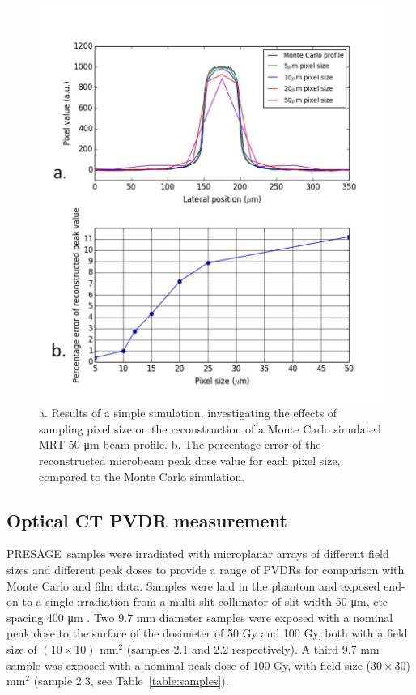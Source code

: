 	\begin{figure}
		\centering
		\includegraphics[width=\linewidth]{mrt_img/Beam_10um_sampling}
		\caption{a. Results of a simple simulation, investigating the effects of   sampling pixel size on the reconstruction of a Monte Carlo simulated  MRT 50 \si{\um} beam  profile. b. The percentage error of the reconstructed microbeam peak dose value for each pixel size, compared to the Monte Carlo simulation.}
		\label{fig:Beam_10um_sampling}
	\end{figure}
	
	\subsection{Optical CT PVDR measurement}
	PRESAGE\textregistered \ samples were irradiated with microplanar arrays of different field sizes and different peak doses to provide a range of PVDRs for comparison with Monte Carlo and film data. Samples were laid in the phantom and exposed end-on to a single irradiation from a multi-slit collimator of slit width 50 \si{\um}, ctc spacing 400 \si{\um} \cite{brauer2009new}. Two 9.7 mm diameter samples were exposed with a nominal peak dose to the surface of the dosimeter of 50 Gy and 100 Gy, both with a field size of $(10 \times 10)$ mm$^2$ (samples 2.1 and 2.2 respectively). A third 9.7 mm sample was exposed with a nominal peak dose of 100 Gy, with field size ($30 \times 30$) mm$^2$ (sample 2.3, see Table~\ref{table:samples}). 
	

